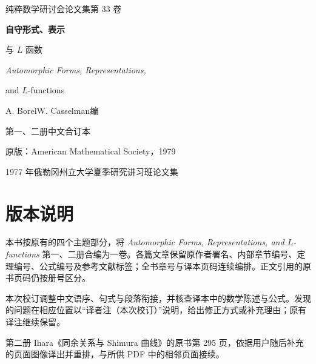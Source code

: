 \begin{titlepage}
\thispagestyle{empty}
\vspace*{25mm}
{\sffamily\color{BookAccent}\large 纯粹数学研讨会论文集\quad 第 33 卷}\par
\vspace{22mm}
{\Huge\sffamily\bfseries\color{BookInk}自守形式、表示\par\vspace{5mm}与 $L$ 函数}\par
\vspace{12mm}
{\Large\itshape Automorphic Forms, Representations,\par and $L$-functions}\par
\vspace{16mm}
{\Large A. Borel\quad W. Casselman\quad 编}\par
\vspace{6mm}
{\large 第一、二册中文合订本}\par
\vfill
{\color{BookGray}原版：American Mathematical Society，1979\par
1977 年俄勒冈州立大学夏季研究讲习班论文集}\par
\vspace{13mm}
\end{titlepage}

\chapter*{版本说明}
\providecommand{\DraftNotice}{}\DraftNotice
本书按原有的四个主题部分，将 \textit{Automorphic Forms, Representations, and $L$-functions} 第一、二册合编为一卷。各篇文章保留原作者署名、内部章节编号、定理编号、公式编号及参考文献标签；全书章号与译本页码连续编排。正文引用的原书页码仍按册号区分。

本次校订调整中文语序、句式与段落衔接，并核查译本中的数学陈述与公式。发现的问题在相应位置以“译者注（本次校订）”说明，给出修正方式或补充理由；原有译注继续保留。

第二册 Ihara《同余关系与 Shimura 曲线》的原书第 295 页，依据用户随后补充的页面图像译出并重排，与所供 PDF 中的相邻页面接续。

